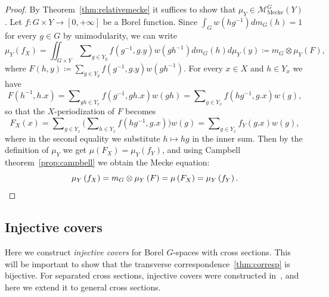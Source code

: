 \documentclass{amsart}
\numberwithin{equation}{subsection}
\theoremstyle{remark}
\begin{document}
\begin{proof}
By Theorem~\ref{thm:relativemecke} it suffices to show that \(\mu_{Y}\in \mathcal{M}_{\mathrm{Mecke}}^{G}\left(Y\right)\). Let \(f:G\times Y\to\left[0,+\infty\right]\) be a Borel function. Since \(\int_{G}w\left(hg^{-1}\right)dm_{G}\left(h\right)=1\) for every \(g\in G\) by unimodularity, we can write
\[\mu_{Y}\left(f_{X}\right)=\iint\nolimits_{G\times Y}\sum\nolimits_{g\in Y_{y}}f\left(g^{-1},g.y\right)w\left(gh^{-1}\right)dm_{G}\left(h\right)d\mu_{Y}\left(y\right)\coloneqq m_{G}\otimes\mu_{Y}\left(F\right),\]
where \(F\left(h,y\right)\coloneqq \sum\nolimits_{g\in Y_{y}}f\left(g^{-1},g.y\right)w\left(gh^{-1}\right)\). For every \(x\in X\) and \(h\in Y_{x}\) we have
\[F\left(h^{-1},h.x\right)=\sum\nolimits_{gh\in Y_{x}}f\left(g^{-1},gh.x\right)w\left(gh\right)=\sum\nolimits_{g\in Y_{x}}f\left(hg^{-1},g.x\right)w\left(g\right),\]
so that the \(X\)-periodization of \(F\) becomes
\[F_{X}\left(x\right)=\sum\nolimits_{g\in Y_{x}}\Big(\sum\nolimits_{h\in Y_{x}}f\left(hg^{-1},g.x\right)\Big)w\left(g\right)=\sum\nolimits_{g\in Y_{x}}f_{Y}\left(g.x\right)w\left(g\right),\]
where in the second equality we substitute \(h\mapsto hg\) in the inner sum. Then by the definition of \(\mu_{Y}\) we get \(\mu\left(F_{X}\right)=\mu_{Y}\left(f_{Y}\right)\), and using Campbell theorem~\ref{prop:campbell} we obtain the Mecke equation:
\[\mu_{Y}\left(f_{X}\right)=m_{G}\otimes\mu_{Y}\left(F\right)=\mu\left(F_{X}\right)=\mu_{Y}\left(f_{Y}\right).\qedhere\]
\end{proof}

\subsection{Injective covers}

Here we construct \emph{injective covers} for Borel \(G\)-spaces with cross sections. This will be important to show that the transverse correspondence~\ref{thm:corresp} is bijective. For separated cross sections, injective covers were constructed in~\cite[\S3.1]{bjorklund2025int}, and here we extend it to general cross sections.
\end{document}
